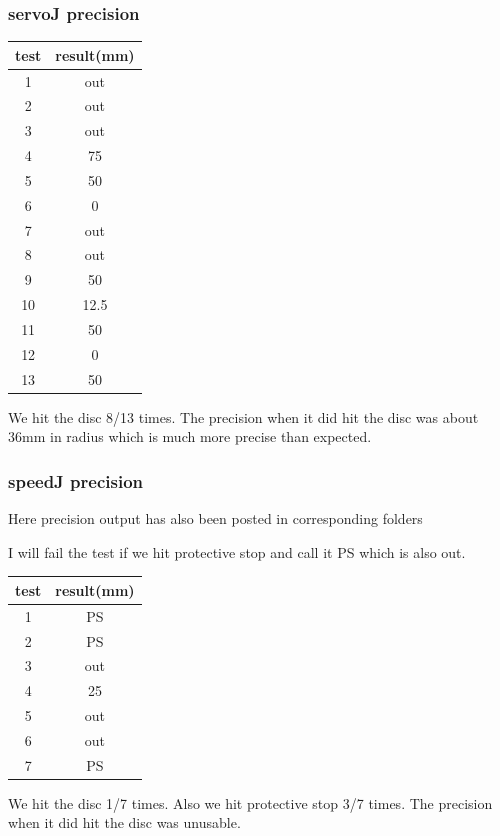 \subsubsection{servoJ precision}
\begin{tabular}{|c|c|}
\hline
test & result(mm) \\ \hline
1 & out \\ \hline
2 & out \\ \hline
3 & out \\ \hline
4 & 75 \\ \hline
5 & 50 \\ \hline
6 & 0 \\ \hline
7 & out \\ \hline
8 & out \\ \hline
9 & 50 \\ \hline
10 & 12.5 \\ \hline
11 & 50 \\ \hline
12 & 0 \\ \hline
13 & 50 \\ \hline

\end{tabular}

We hit the disc 8/13 times.\newline
The precision when it did hit the disc was about 36mm in radius which is much more precise than expected. 

\subsubsection{speedJ precision}

Here precision output has also been posted in corresponding folders

I will fail the test if we hit protective stop and call it PS which is also out.

\begin{tabular}{|c|c|}
\hline
test & result(mm) \\ \hline
1 & PS \\ \hline
2 & PS \\ \hline
3 & out \\ \hline
4 & 25 \\ \hline
5 & out \\ \hline
6 & out \\ \hline
7 & PS \\ \hline

\end{tabular}

We hit the disc 1/7 times.\newline
Also we hit protective stop 3/7 times.\newline
The precision when it did hit the disc was unusable. 

